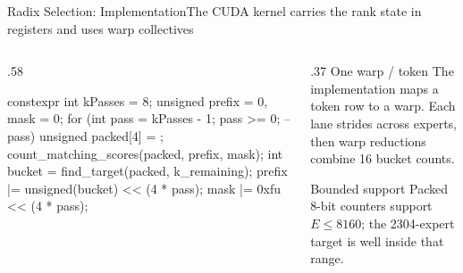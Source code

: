 \documentclass[aspectratio=169,10pt]{beamer}
\renewcommand{\NvidiaSource}[1]{}
\begin{document}
\begin{frame}[fragile]{Radix Selection: Implementation}{The CUDA kernel carries the rank state in registers and uses warp collectives}
  \NvidiaSource{\texttt{TE/transformer\_engine/common/fused\_router/utils.h}}
  \begin{columns}[T,onlytextwidth]
    \begin{column}{.58\textwidth}
      \begin{NvidiaCode}[language=NvidiaCUDA,basicstyle=\ttfamily\fontsize{6.5}{7.6}\selectfont]
constexpr int kPasses = 8;
unsigned prefix = 0, mask = 0;
for (int pass = kPasses - 1; pass >= 0; --pass) {
  unsigned packed[4] = {};
  count_matching_scores(packed, prefix, mask);
  int bucket = find_target(packed, k_remaining);
  prefix |= unsigned(bucket) << (4 * pass);
  mask   |= 0xfu << (4 * pass);
}
      \end{NvidiaCode}
    \end{column}
    \begin{column}{.37\textwidth}
      {\NvidiaSansMedium One warp / token}\NvidiaTightRule{.6pt}\vspace{.07in}
      \small The implementation maps a token row to a warp. Each lane strides across experts,
      then warp reductions combine 16 bucket counts.
      \vspace{.10in}
      \begin{NvidiaEvidence}{Bounded support}
        Packed 8-bit counters support $E\leq8160$; the 2304-expert target is well inside that
        range.
      \end{NvidiaEvidence}
    \end{column}
  \end{columns}
\end{frame}
\end{document}
